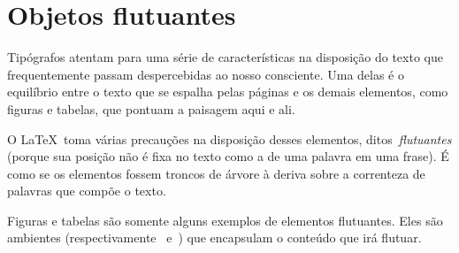 \section{Objetos flutuantes}\label{sec:floats}

Tipógrafos atentam para uma série de características na disposição do
texto que frequentemente passam despercebidas ao nosso consciente. Uma
delas é o equilíbrio entre o texto que se espalha pelas páginas e os
demais elementos, como figuras e tabelas, que pontuam a paisagem aqui
e ali. 

O \LaTeX\ toma várias precauções na disposição desses elementos,
ditos~\emph{flutuantes} (porque sua posição não é fixa no texto como a
de uma palavra em uma frase). É como se os elementos fossem troncos de
árvore à deriva sobre a correnteza de palavras que compõe o texto.

Figuras e tabelas são somente alguns exemplos de elementos
flutuantes. Eles são ambientes (respectivamente~
e~) que encapsulam o conteúdo que irá flutuar.

